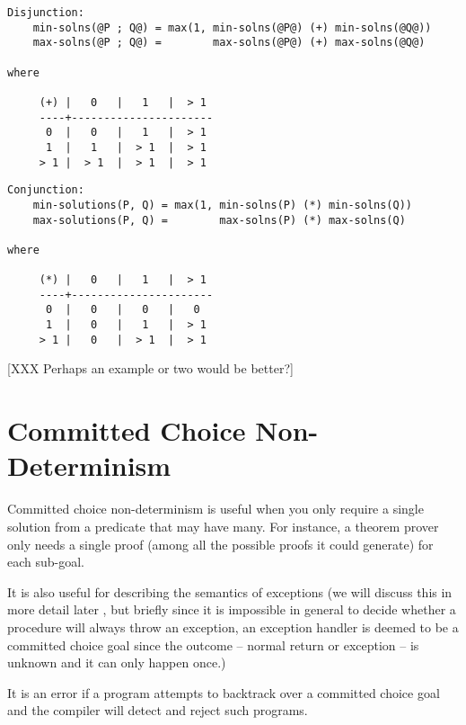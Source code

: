 
\begin{verbatim}
Disjunction:
    min-solns(@P ; Q@) = max(1, min-solns(@P@) (+) min-solns(@Q@))
    max-solns(@P ; Q@) =        max-solns(@P@) (+) max-solns(@Q@)

where

     (+) |   0   |   1   |  > 1
     ----+----------------------
      0  |   0   |   1   |  > 1
      1  |   1   |  > 1  |  > 1
     > 1 |  > 1  |  > 1  |  > 1
\end{verbatim}

\begin{verbatim}
Conjunction:
    min-solutions(P, Q) = max(1, min-solns(P) (*) min-solns(Q))
    max-solutions(P, Q) =        max-solns(P) (*) max-solns(Q)

where

     (*) |   0   |   1   |  > 1
     ----+----------------------
      0  |   0   |   0   |   0
      1  |   0   |   1   |  > 1
     > 1 |   0   |  > 1  |  > 1
\end{verbatim}

[XXX Perhaps an example or two would be better?]

\section{Committed Choice Non-Determinism}

Committed choice non-determinism is useful when you only
require a single solution from a predicate that may have many.
For instance, a theorem prover only needs a single proof
(among all the possible proofs it could generate) for each
sub-goal. 

It is also useful for describing the semantics of exceptions
(we will discuss this in more detail later \XXX{}, but briefly
since it is impossible in general to decide whether a
procedure will always throw an exception, an exception handler
is deemed to be a committed choice goal since the outcome --
normal return or exception -- is unknown and it can only happen
once.)


It is an error if a program attempts to backtrack over a
committed choice goal and the compiler will detect and reject
such programs.

